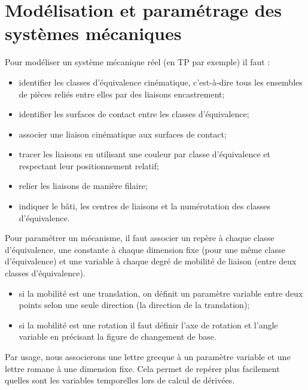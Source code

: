 %
%

\section{Modélisation et paramétrage des systèmes mécaniques}
\begin{methode}

Pour modéliser un système mécanique réel (en TP par exemple) il faut : 
\begin{itemize}
\item identifier les classes d'équivalence cinématique, c'est-à-dire tous les ensembles de pièces reliés entre elles par des liaisons encastrement;
\item identifier les surfaces de contact entre les classes d'équivalence;
\item associer une liaison cinématique aux surfaces de contact;
\item tracer les liaisons en utilisant une couleur par classe d'équivalence et respectant leur positionnement relatif;
\item relier les liaisons de manière filaire;
\item indiquer le bâti, les centres de liaisons et la numérotation des classes d'équivalence.
\end{itemize}
\end{methode}

\begin{methode}
Pour paramétrer un mécanisme, il faut associer un repère à chaque classe d'équivalence, une constante à chaque dimension fixe (pour une même classe d'équivalence) et une variable à chaque degré de mobilité de liaison (entre deux classes d'équivalence). 
\begin{itemize}
\item si la mobilité est une translation, on définit un paramètre variable entre deux points selon une seule direction (la direction de la translation);
\item si la mobilité est une rotation il faut définir l'axe de rotation et l'angle variable en précisant la figure de changement de base.
\end{itemize}
\begin{rem}
Par usage, nous associerons une lettre grecque à un paramètre variable et une lettre romane à une dimension fixe. Cela permet de repérer plus facilement quelles sont les variables temporelles lors de calcul de dérivées. 
\end{rem}
\end{methode}

